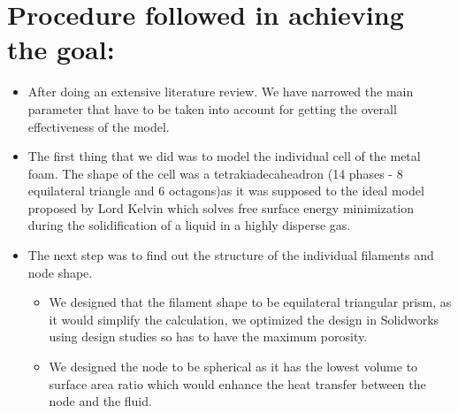 \documentclass[compileTAMUreport.tex]{subfiles}
\begin{document}
\section{Procedure followed in achieving the goal:}
\begin{itemize}
\item After doing an extensive literature review. We have narrowed the main parameter that have to be taken into account for getting the overall effectiveness of the model.
\item The first thing that we did was to model the individual cell of the metal foam. The shape of the cell was a tetrakiadecaheadron (14 phases - 8 equilateral triangle and 6 octagons)as it was supposed to the ideal model proposed by Lord Kelvin which solves free surface energy minimization during the solidification of a liquid in a highly disperse gas.
\item The next step was to find out the structure of the individual filaments and node shape.

\begin{itemize}

\item We designed that the filament shape to be equilateral triangular prism, as it would simplify the calculation, we optimized the design in Solidworks using design studies so has to have the maximum porosity.
\item We designed the node to be spherical as it has the lowest volume to surface area ratio which would enhance the heat transfer between the node and the fluid.
\end{itemize}



\end{itemize}
\end{document}
